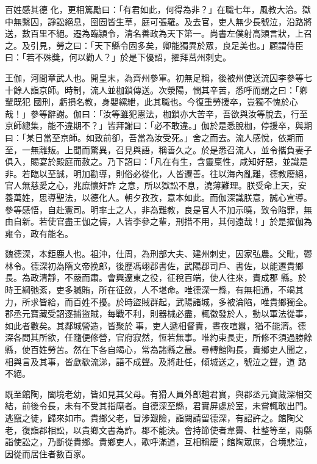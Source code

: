 \begin{pinyinscope}
 百姓感其德
 化，更相篤勵曰：「有君如此，何得為非？」在職七年，風教大洽。獄中無繫囚，諍訟絕息，囹圄皆生草，庭可張羅。及去官，吏人無少長號泣，沿路將送，數百里不絕。遷為臨潁令，清名善政為天下第一。尚書左僕射高熲言狀，上召之。及引見，勞之曰：「天下縣令固多矣，卿能獨異於眾，良足美也。」顧謂侍臣曰：「若不殊獎，何以勸人？」於是下優詔，擢拜莒州刺史。



 王伽，河間章武人也。開皇末，為齊州參軍。初無足稱，後被州使送流囚李參等七十餘人詣京師。時制，流人並枷鎖傳送。次滎陽，憫其辛苦，悉呼而謂之曰：「卿輩既犯
 國刑，虧損名教，身嬰縲紲，此其職也。今復重勞援卒，豈獨不愧於心哉！」參等辭謝。伽曰：「汝等雖犯憲法，枷鎖亦大苦辛，吾欲與汝等脫去，行至京師總集，能不違期不？」皆拜謝曰：「必不敢違。」伽於是悉脫枷，停援卒，與期曰：「某日當至京師。如致前卻，吾當為汝受死。」舍之而去。流人感悅，依期而至，一無離叛。上聞而驚異，召見與語，稱善久之。於是悉召流人，並令攜負妻子俱入，賜宴於殿庭而赦之。乃下詔曰：「凡在有生，含靈稟性，咸知好惡，並識是非。若臨以至誠，明加勸導，則俗必從化，人皆遷善。往以海內亂離，德教廢絕，官人無慈愛之心，兆庶懷奸詐
 之意，所以獄訟不息，澆薄難理。朕受命上天，安養萬姓，思導聖法，以德化人。朝夕孜孜，意本如此。而伽深識朕意，誠心宣導。參等感悟，自赴憲司。明率土之人，非為難教，良是官人不加示曉，致令陷罪，無由自新。若使官盡王伽之儔，人皆李參之輩，刑措不用，其何遠哉！」於是擢伽為雍令，政有能名。



 魏德深，本鉅鹿人也。祖沖，仕周，為刑部大夫、建州刺史，因家弘農。父毗，鬱林令。德深初為隋文帝挽郎，後歷馮翊郡書佐，武陽郡司戶、書佐，以能遷貴鄉長。為政清靜，不嚴而肅。會興遼東之役，征稅百端，使人往來，責成郡
 縣。於時王綱弛紊，吏多贓賄，所在征斂，人不堪命。唯德深一縣，有無相通，不竭其力，所求皆給，而百姓不擾。於時盜賊群起，武陽諸城，多被淪陷，唯貴鄉獨全。郡丞元寶藏受詔逐捕盜賊，每戰不利，則器械必盡，輒徵發於人，動以軍法從事，如此者數矣。其鄰城營造，皆聚於事，吏人遞相督責，晝夜喧囂，猶不能濟。德深各問其所欲，任隨便修營，官府寂然，恆若無事。唯約束長吏，所修不須過勝餘縣，使百姓勞苦。然在下各自竭心，常為諸縣之最。尋轉館陶長，貴鄉吏人聞之，相與言及其事，皆歔欷流涕，語不成聲。及將赴任，傾城送之，號泣之聲，道
 路不絕。



 既至館陶，闔境老幼，皆如見其父母。有猾人員外郎趙君實，與郡丞元寶藏深相交結，前後令長，未有不受其指麾者。自德深至縣，君實屏處於室，未嘗輒敢出門。逃竄之徒，歸來如市。貴鄉父老，冒涉艱險，詣闕請留德深，有詔許之。館陶父老，復詣郡相訟，以貴鄉文書為詐。郡不能決。會持節使者韋霽、杜整等至，兩縣詣使訟之，乃斷從貴鄉。貴鄉吏人，歌呼滿道，互相稱慶；館陶眾庶，合境悲泣，因從而居住者數百家。




\end{pinyinscope}
